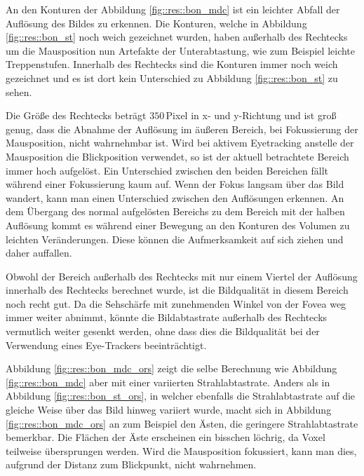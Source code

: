 An den Konturen der Abbildung \ref{fig::res::bon_mdc} ist ein leichter Abfall der Auflösung des Bildes zu erkennen.
Die Konturen, welche in Abbildung \ref{fig::res::bon_st} noch weich gezeichnet wurden, haben außerhalb des Rechtecks um die Mausposition nun Artefakte der Unterabtastung, wie zum Beispiel leichte Treppenstufen.
Innerhalb des Rechtecks sind die Konturen immer noch weich gezeichnet und es ist dort kein Unterschied zu Abbildung \ref{fig::res::bon_st} zu sehen.

Die Größe des Rechtecks beträgt $350$\,Pixel in x- und y-Richtung und ist groß genug, dass die Abnahme der Auflösung im äußeren Bereich, bei Fokussierung der Mausposition, nicht wahrnehmbar ist.
Wird bei aktivem Eyetracking anstelle der Mausposition die Blickposition verwendet, so ist der aktuell betrachtete Bereich immer hoch aufgelöst.
Ein Unterschied zwischen den beiden Bereichen fällt während einer Fokussierung kaum auf.
Wenn der Fokus langsam über das Bild wandert, kann man einen Unterschied zwischen den Auflösungen erkennen.
An dem Übergang des normal aufgelösten Bereichs zu dem Bereich mit der halben Auflösung kommt es während einer Bewegung an den Konturen des Volumen zu leichten Veränderungen.
Diese können die Aufmerksamkeit auf sich ziehen und daher auffallen.

Obwohl der Bereich außerhalb des Rechtecks mit nur einem Viertel der Auflösung innerhalb des Rechtecks berechnet wurde, ist die Bildqualität in diesem Bereich noch recht gut.
Da die Sehschärfe mit zunehmenden Winkel von der Fovea weg immer weiter abnimmt, könnte die Bildabtastrate außerhalb des Rechtecks vermutlich weiter gesenkt werden, ohne dass dies die Bildqualität bei der Verwendung eines Eye-Trackers beeinträchtigt.

Abbildung \ref{fig::res::bon_mdc_ors} zeigt die selbe Berechnung wie Abbildung \ref{fig::res::bon_mdc} aber mit einer variierten Strahlabtastrate.
Anders als in Abbildung \ref{fig::res::bon_st_ors}, in welcher ebenfalls die Strahlabtastrate auf die gleiche Weise über das Bild hinweg variiert wurde, macht sich in Abbildung \ref{fig::res::bon_mdc_ors} an zum Beispiel den Ästen, die geringere Strahlabtastrate bemerkbar.
Die Flächen der Äste erscheinen ein bisschen löchrig, da Voxel teilweise übersprungen werden.
Wird die Mausposition fokussiert, kann man dies, aufgrund der Distanz zum Blickpunkt, nicht wahrnehmen.

